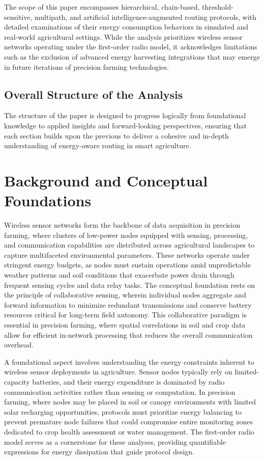 \documentclass[12pt]{article}
\begin{document}
The scope of this paper encompasses hierarchical, chain-based, threshold-sensitive, multipath, and artificial intelligence-augmented routing protocols, with detailed examinations of their energy consumption behaviors in simulated and real-world agricultural settings. While the analysis prioritizes wireless sensor networks operating under the first-order radio model, it acknowledges limitations such as the exclusion of advanced energy harvesting integrations that may emerge in future iterations of precision farming technologies.

\subsection{Overall Structure of the Analysis}

The structure of the paper is designed to progress logically from foundational knowledge to applied insights and forward-looking perspectives, ensuring that each section builds upon the previous to deliver a cohesive and in-depth understanding of energy-aware routing in smart agriculture.

\section{Background and Conceptual Foundations}

Wireless sensor networks form the backbone of data acquisition in precision farming, where clusters of low-power nodes equipped with sensing, processing, and communication capabilities are distributed across agricultural landscapes to capture multifaceted environmental parameters. These networks operate under stringent energy budgets, as nodes must sustain operations amid unpredictable weather patterns and soil conditions that exacerbate power drain through frequent sensing cycles and data relay tasks. The conceptual foundation rests on the principle of collaborative sensing, wherein individual nodes aggregate and forward information to minimize redundant transmissions and conserve battery resources critical for long-term field autonomy. This collaborative paradigm is essential in precision farming, where spatial correlations in soil and crop data allow for efficient in-network processing that reduces the overall communication overhead.

A foundational aspect involves understanding the energy constraints inherent to wireless sensor deployments in agriculture. Sensor nodes typically rely on limited-capacity batteries, and their energy expenditure is dominated by radio communication activities rather than sensing or computation. In precision farming, where nodes may be placed in soil or canopy environments with limited solar recharging opportunities, protocols must prioritize energy balancing to prevent premature node failures that could compromise entire monitoring zones dedicated to crop health assessment or water management. The first-order radio model serves as a cornerstone for these analyses, providing quantifiable expressions for energy dissipation that guide protocol design.
\end{document}
